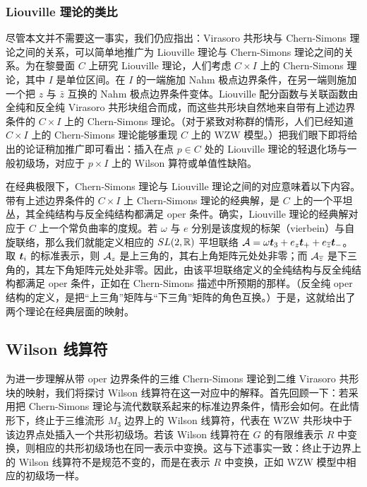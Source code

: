 \subsubsection{Liouville 理论的类比}\label{analiouville}

尽管本文并不需要这一事实，我们仍应指出：Virasoro 共形块与 Chern-Simons 理论之间的关系，可以简单地推广为 Liouville 理论与 Chern-Simons 理论之间的关系。为在黎曼面 $C$ 上研究 Liouville 理论，人们考虑 $C\times I$ 上的 Chern-Simons 理论，其中 $I$ 是单位区间。在 $I$ 的一端施加 Nahm 极点边界条件，在另一端则施加一个把 $z$ 与 $\bar z$ 互换的 Nahm 极点边界条件变体。Liouville 配分函数与关联函数由全纯和反全纯 Virasoro 共形块组合而成，而这些共形块自然地来自带有上述边界条件的 $C\times I$ 上的 Chern-Simons 理论。（对于紧致对称群的情形，人们已经知道 $C\times I$ 上的 Chern-Simons 理论能够重现 $C$ 上的 WZW 模型。）把我们眼下即将给出的论证稍加推广即可看出：插入在点 $p\in C$ 处的 Liouville 理论的轻退化场与一般初级场，对应于 $p\times I$ 上的 Wilson 算符或单值性缺陷。

在经典极限下，Chern-Simons 理论与 Liouville 理论之间的对应意味着以下内容。带有上述边界条件的 $C\times I$ 上 Chern-Simons 理论的经典解，是 $C$ 上的一个平坦丛，其全纯结构与反全纯结构都满足 oper 条件。确实，Liouville 理论的经典解对应于 $C$ 上一个常负曲率的度规。若 $\omega$ 与 $e$ 分别是该度规的标架（vierbein）与自旋联络，那么我们就能定义相应的 $SL(2,{\mathbb R})$ 平坦联络 ${\mathcal A}=\omega {{\boldsymbol{t}}}_3+
e_{ z} {\boldsymbol{t}}_++e_{\overline z}{\boldsymbol{t}}_-$。取 ${\boldsymbol{t}}_i$ 的标准表示，则 ${\mathcal A}_z$ 是上三角的，其右上角矩阵元处处非零；而 ${\mathcal A}_{\overline z}$ 是下三角的，其左下角矩阵元处处非零。因此，由该平坦联络定义的全纯结构与反全纯结构都满足 oper 条件，正如在 Chern-Simons 描述中所预期的那样。（反全纯 oper 结构的定义，是把“上三角”矩阵与“下三角”矩阵的角色互换。）于是，这就给出了两个理论在经典层面的映射。



\subsection{Wilson 线算符}\label{wilson}

为进一步理解从带 oper 边界条件的三维 Chern-Simons 理论到二维 Virasoro 共形块的映射，我们将探讨 Wilson 线算符在这一对应中的解释。首先回顾一下：若采用把 Chern-Simons 理论与流代数联系起来的标准边界条件，情形会如何。在此情形下，终止于三维流形 $M_3$ 边界上的 Wilson 线算符，代表在 WZW 共形块中于该边界点处插入一个共形初级场。若该 Wilson 线算符在 $G$ 的有限维表示 $R$ 中变换，则相应的共形初级场也在同一表示中变换。这与下述事实一致：终止于边界上的 Wilson 线算符不是规范不变的，而是在表示 $R$ 中变换，正如 WZW 模型中相应的初级场一样。

